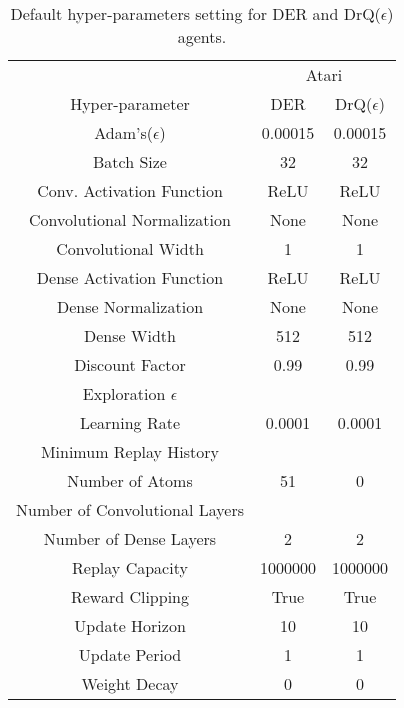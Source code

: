 \documentclass[10pt]{article} %
\begin{document}
\begin{table}[!h]
 \centering
  \caption{Default hyper-parameters setting for DER and DrQ($\epsilon$) agents.}
  \label{tbl:defaultvalues}
 \begin{tabular}{@{} ccc @{}}
    \toprule
    & \multicolumn{2}{c}{Atari}\\
    \cmidrule(lr){2-3}
  Hyper-parameter &  DER & DrQ($\epsilon$) \\
    \midrule
     Adam's($\epsilon$) & 0.00015 & 0.00015\\
     Batch Size & 32 & 32\\
     Conv. Activation Function & ReLU & ReLU \\
     Convolutional Normalization & None & None \\
     Convolutional Width & 1& 1\\
     Dense Activation Function & ReLU & ReLU\\
     Dense Normalization & None & None \\
     Dense Width & 512 & 512 \\
     Discount Factor & 0.99 & 0.99 \\
     Exploration $\epsilon$ & & \\
     Learning Rate & 0.0001 & 0.0001 \\
     Minimum Replay History & & \\
     Number of Atoms & 51 & 0 \\
     Number of Convolutional Layers & & \\
     Number of Dense Layers & 2 & 2\\
     Replay Capacity & 1000000 & 1000000 \\
     Reward Clipping & True & True \\
     Update Horizon & 10 & 10 \\
     Update Period & 1& 1\\
    Weight Decay & 0 & 0\\
     \bottomrule
  \end{tabular}
\end{table}
\end{document}
